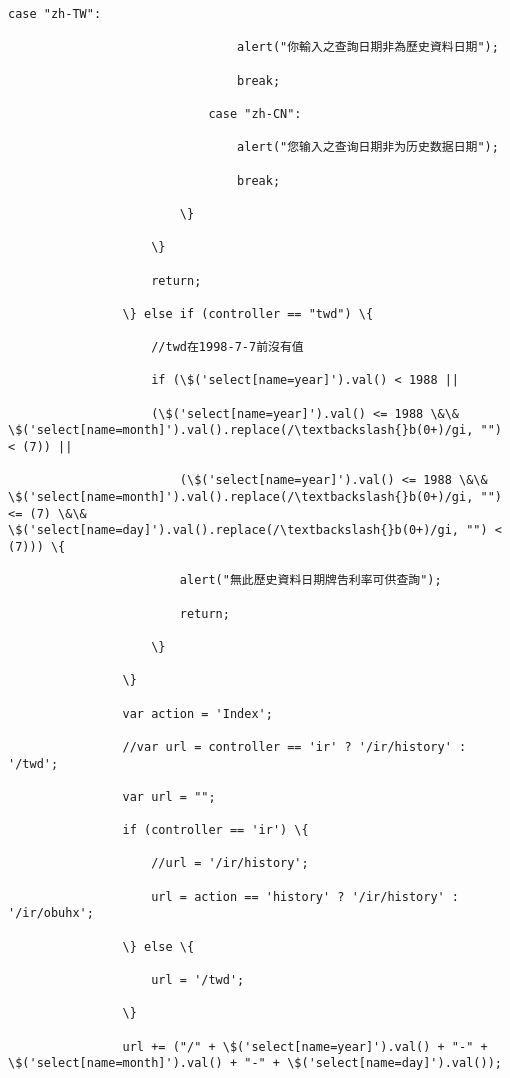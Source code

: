 \documentclass[11pt]{article}
\begin{document}
\begin{Verbatim}[commandchars=\\\{\}]
                            case "zh-TW":

                                alert("你輸入之查詢日期非為歷史資料日期");

                                break;

                            case "zh-CN":

                                alert("您输入之查询日期非为历史数据日期");

                                break;

                        \}

                    \}

                    return;

                \} else if (controller == "twd") \{

                    //twd在1998-7-7前沒有值

                    if (\$('select[name=year]').val() < 1988 ||

                    (\$('select[name=year]').val() <= 1988 \&\& \$('select[name=month]').val().replace(/\textbackslash{}b(0+)/gi, "") < (7)) ||

                        (\$('select[name=year]').val() <= 1988 \&\& \$('select[name=month]').val().replace(/\textbackslash{}b(0+)/gi, "") <= (7) \&\& \$('select[name=day]').val().replace(/\textbackslash{}b(0+)/gi, "") < (7))) \{

                        alert("無此歷史資料日期牌告利率可供查詢");

                        return;

                    \}

                \}

                var action = 'Index';

                //var url = controller == 'ir' ? '/ir/history' : '/twd';

                var url = "";

                if (controller == 'ir') \{

                    //url = '/ir/history';

                    url = action == 'history' ? '/ir/history' : '/ir/obuhx';

                \} else \{

                    url = '/twd';

                \}

                url += ("/" + \$('select[name=year]').val() + "-" + \$('select[name=month]').val() + "-" + \$('select[name=day]').val());


\end{Verbatim}
\end{document}
